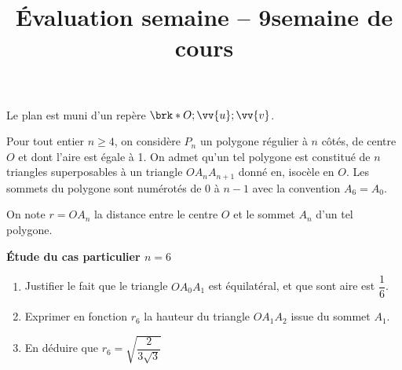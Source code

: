 \documentclass[a4paper,12pt,french]{article}
\author{}
\title{Évaluation semaine \no{45} -- 9\ieme semaine de cours}
\begin{document}
\maketitle

\thispagestyle{fancy}

\begin{question}
  Le plan est muni d'un repère $\brk*{O ; \vv{u}; \vv{v}}$.

  Pour tout entier $n ≥ 4$, on considère $P_n$ un polygone régulier à $n$
  côtés, de centre $O$ et dont l'aire est égale à 1. On admet qu'un tel
  polygone est constitué de $n$ triangles superposables à un triangle
  $OA_nA_{n+1}$ donné en, isocèle en $O$. Les sommets du polygone sont
  numérotés de 0 à $n-1$ avec la convention $A_6 = A_0$.

  On note $r = OA_n$ la distance entre le centre $O$ et le sommet $A_n$ d'un
  tel polygone.

  \textbf{Étude du cas particulier $n=6$}

  \begin{enumerate}
    \item Justifier le fait que le triangle $OA_0A_1$ est équilatéral, et
      que sont aire est $\dfrac16$.
    \item Exprimer en fonction $r_6$ la hauteur du triangle $OA_1A_2$ issue
      du sommet $A_1$.
    \item En déduire que $r_6 = \sqrt{\dfrac{2}{3\sqrt{3}}}$
  \end{enumerate}
\end{question}
\end{document}
